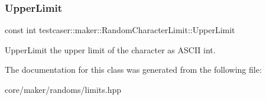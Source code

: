 \subsubsection{\texorpdfstring{UpperLimit}{UpperLimit}}
{\footnotesize\ttfamily const int testcaser\+::maker\+::\+Random\+Character\+Limit\+::\+Upper\+Limit}



Upper\+Limit the upper limit of the character as A\+S\+C\+II int. 



The documentation for this class was generated from the following file\+:\begin{DoxyCompactItemize}
\item 
core/maker/randoms/limits.\+hpp\end{DoxyCompactItemize}
